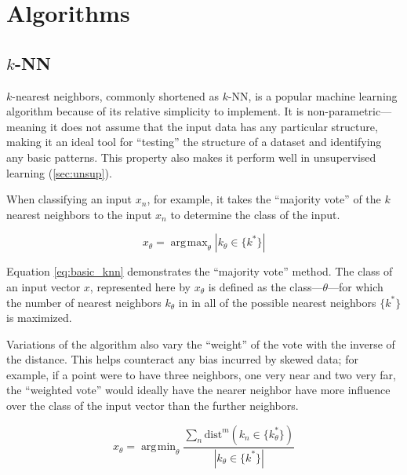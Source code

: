 \documentclass{comjnl}
\def\abs#1{\left| #1 \right|}
\DeclareMathOperator*{\argmax}{\arg\!\max}
\DeclareMathOperator*{\argmin}{\arg\!\min}
\numberwithin{equation}{subsection}
\begin{document}

    \section{Algorithms}\label{sec:alg}

        \subsection{$k$-NN}\label{subsec:knn}

            $k$-nearest neighbors, commonly shortened as $k$-NN, is a popular machine learning
            algorithm because of its relative simplicity to implement. It is non-parametric---
            meaning it does not assume that the input data has any particular structure, making it
            an ideal tool for ``testing'' the structure of a dataset and identifying any basic
            patterns. This property also makes it perform well in unsupervised learning
            (\ref{sec:unsup}).

            When classifying an input $x_n$, for example, it takes the ``majority vote'' of the $k$
            nearest neighbors to the input $x_n$ to determine the class of the input. 

            \begin{equation}\label{eq:basic_knn}
                x_{\theta}=\argmax_{\theta} \abs{k_{\theta} \in \{k^*\}}
            \end{equation}

            \noindent Equation \eqref{eq:basic_knn} demonstrates the ``majority vote'' method.
            The class of an input vector $x$, represented here by $x_{\theta}$ is defined as the
            class---$\theta$---for which the number of nearest neighbors $k_{\theta}$ in in all of
            the possible nearest neighbors $\{k^*\}$ is maximized.

            Variations of the algorithm also vary the ``weight'' of the vote with the inverse of
            the distance. This helps counteract any bias incurred by skewed data; for example, if
            a point were to have three neighbors, one very near and two very far, the ``weighted
            vote'' would ideally have the nearer neighbor have more influence over the class of the
            input vector than the further neighbors.

            \begin{equation}\label{eq:weighted_knn}
                x_{\theta}=\argmin_{\theta} \frac{\sum_n{\text{dist}^m(k_n \in \{k_{\theta}^*\})}}{\abs{k_{\theta} \in \{k^*\}}}
            \end{equation}
\end{document}
